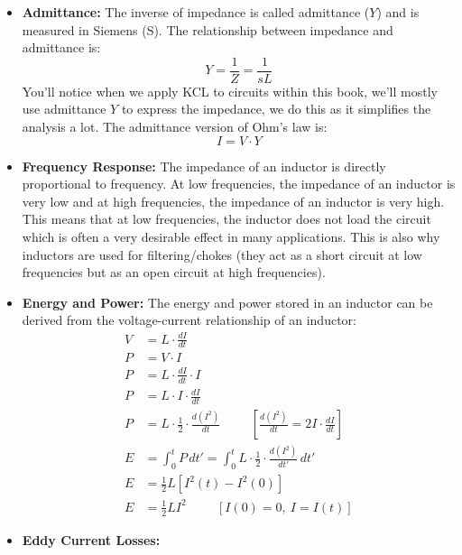 \begin{itemize}
\begin{align*}
    \end{align*}
    We can now define the impedance of an inductor as:
    \[
      Z_L = \frac{V(s)}{I(s)} = s L = j\omega L = j 2 \pi f L \hspace{1cm} [s = j\omega = j 2\pi f]
    \]
  \item \textbf{Admittance:}
    The inverse of impedance is called admittance (\(Y\)) and is
    measured in Siemens (S). The relationship between impedance
    and admittance is:
    \[
      Y = \frac{1}{Z} = \frac{1}{sL}
    \]
    You'll notice when we apply KCL to circuits within this book,
    we'll mostly use admittance \(Y\) to express the impedance, we
    do this as it simplifies the analysis a lot. The admittance
    version of Ohm's law is:
    \[
      I = V \cdot Y
    \]
  \item \textbf{Frequency Response:}
    The impedance of an inductor is directly proportional to
    frequency. At low frequencies, the impedance of an inductor is
    very low and at high frequencies, the impedance of an inductor
    is very high. This means that at low frequencies, the inductor
    does not load the circuit which is often a very desirable
    effect  in many applications. This is also why inductors are
    used for filtering/chokes (they act as a short circuit at low
    frequencies but as an open circuit at high frequencies).
  \item \textbf{Energy and Power:}
    The energy and power stored in an inductor can be derived
    from the voltage-current relationship of an inductor:
    \begin{align*}
      V &= L \cdot \frac{dI}{dt} \\
      P &= V \cdot I \\
      P &= L \cdot \frac{dI}{dt} \cdot I \\
      P &= L \cdot I \cdot \frac{dI}{dt} \\
      P &= L \cdot \frac{1}{2} \cdot \frac{d(I^2)}{dt} \hspace{1cm} [\frac{d(I^2)}{dt} = 2I \cdot \frac{dI}{dt}] \\
      E &= \int_0^t P \, dt' = \int_0^t L \cdot \frac{1}{2} \cdot \frac{d(I^2)}{dt'} \, dt' \\
      E &= \frac{1}{2} L \left[ I^2(t) - I^2(0) \right] \\
      E &= \frac{1}{2} L I^2 \hspace{1cm} [I(0) = 0,\ I = I(t)]
    \end{align*}
  \item \textbf{Eddy Current Losses:}

\end{itemize}
